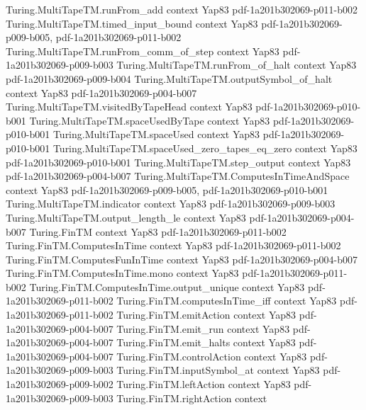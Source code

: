 \begin{theorem}
  {Turing.MultiTapeTM.runFrom_add}
  {context}
  {Yap83}
  {pdf-1a201b302069-p011-b002}
\proofstep
  {Turing.MultiTapeTM.timed_input_bound}
  {context}
  {Yap83}
  {pdf-1a201b302069-p009-b005,
    pdf-1a201b302069-p011-b002}
\proofstep
  {Turing.MultiTapeTM.runFrom_comm_of_step}
  {context}
  {Yap83}
  {pdf-1a201b302069-p009-b003}
\proofstep
  {Turing.MultiTapeTM.runFrom_of_halt}
  {context}
  {Yap83}
  {pdf-1a201b302069-p009-b004}
\proofstep
  {Turing.MultiTapeTM.outputSymbol_of_halt}
  {context}
  {Yap83}
  {pdf-1a201b302069-p004-b007}
\proofstep
  {Turing.MultiTapeTM.visitedByTapeHead}
  {context}
  {Yap83}
  {pdf-1a201b302069-p010-b001}
\proofstep
  {Turing.MultiTapeTM.spaceUsedByTape}
  {context}
  {Yap83}
  {pdf-1a201b302069-p010-b001}
\proofstep
  {Turing.MultiTapeTM.spaceUsed}
  {context}
  {Yap83}
  {pdf-1a201b302069-p010-b001}
\proofstep
  {Turing.MultiTapeTM.spaceUsed_zero_tapes_eq_zero}
  {context}
  {Yap83}
  {pdf-1a201b302069-p010-b001}
\proofstep
  {Turing.MultiTapeTM.step_output}
  {context}
  {Yap83}
  {pdf-1a201b302069-p004-b007}
\proofstep
  {Turing.MultiTapeTM.ComputesInTimeAndSpace}
  {context}
  {Yap83}
  {pdf-1a201b302069-p009-b005,
    pdf-1a201b302069-p010-b001}
\proofstep
  {Turing.MultiTapeTM.indicator}
  {context}
  {Yap83}
  {pdf-1a201b302069-p009-b003}
\proofstep
  {Turing.MultiTapeTM.output_length_le}
  {context}
  {Yap83}
  {pdf-1a201b302069-p004-b007}
\proofstep
  {Turing.FinTM}
  {context}
  {Yap83}
  {pdf-1a201b302069-p011-b002}
\proofstep
  {Turing.FinTM.ComputesInTime}
  {context}
  {Yap83}
  {pdf-1a201b302069-p011-b002}
\proofstep
  {Turing.FinTM.ComputesFunInTime}
  {context}
  {Yap83}
  {pdf-1a201b302069-p004-b007}
\proofstep
  {Turing.FinTM.ComputesInTime.mono}
  {context}
  {Yap83}
  {pdf-1a201b302069-p011-b002}
\proofstep
  {Turing.FinTM.ComputesInTime.output_unique}
  {context}
  {Yap83}
  {pdf-1a201b302069-p011-b002}
\proofstep
  {Turing.FinTM.computesInTime_iff}
  {context}
  {Yap83}
  {pdf-1a201b302069-p011-b002}
\proofstep
  {Turing.FinTM.emitAction}
  {context}
  {Yap83}
  {pdf-1a201b302069-p004-b007}
\proofstep
  {Turing.FinTM.emit_run}
  {context}
  {Yap83}
  {pdf-1a201b302069-p004-b007}
\proofstep
  {Turing.FinTM.emit_halts}
  {context}
  {Yap83}
  {pdf-1a201b302069-p004-b007}
\proofstep
  {Turing.FinTM.controlAction}
  {context}
  {Yap83}
  {pdf-1a201b302069-p009-b003}
\proofstep
  {Turing.FinTM.inputSymbol_at}
  {context}
  {Yap83}
  {pdf-1a201b302069-p009-b002}
\proofstep
  {Turing.FinTM.leftAction}
  {context}
  {Yap83}
  {pdf-1a201b302069-p009-b003}
\proofstep
  {Turing.FinTM.rightAction}
  {context}

\end{theorem}
